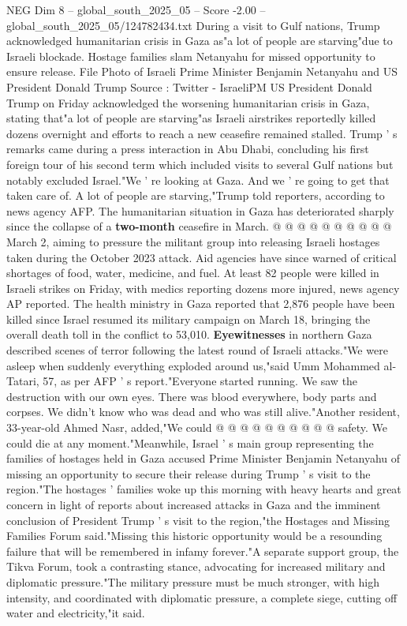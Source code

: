 \begin{textsample}{NEG Dim 8 – global\_south\_2025\_05 – Score -2.00 – global\_south\_2025\_05/124782434.txt}  \label{ex:f8_neg_009}
During a visit to Gulf nations, Trump acknowledged humanitarian crisis in Gaza as"a lot of people are starving"due to Israeli blockade.
Hostage families slam Netanyahu for missed opportunity to ensure release.
File Photo of Israeli Prime Minister Benjamin Netanyahu and US President Donald Trump Source : Twitter - IsraeliPM US President Donald Trump on Friday acknowledged the worsening humanitarian crisis in Gaza, stating that"a lot of people are starving"as Israeli airstrikes reportedly killed dozens overnight and efforts to reach a new ceasefire remained stalled.
Trump ' s remarks came during a press interaction in Abu Dhabi, concluding his first foreign tour of his second term which included visits to several Gulf nations but notably excluded Israel."We ' re looking at Gaza.
And we ' re going to get that taken care of.
A lot of people are starving,"Trump told reporters, according to news agency AFP.
The humanitarian situation in Gaza has deteriorated sharply since the collapse of a \textbf{two-month} ceasefire in March. @ @ @ @ @ @ @ @ @ @ March 2, aiming to pressure the militant group into releasing Israeli hostages taken during the October 2023 attack.
Aid agencies have since warned of critical shortages of food, water, medicine, and fuel.
At least 82 people were killed in Israeli strikes on Friday, with medics reporting dozens more injured, news agency AP reported.
The health ministry in Gaza reported that 2,876 people have been killed since Israel resumed its military campaign on March 18, bringing the overall death toll in the conflict to 53,010. \textbf{Eyewitnesses} in northern Gaza described scenes of terror following the latest round of Israeli attacks."We were asleep when suddenly everything exploded around us,"said Umm Mohammed al-Tatari, 57, as per AFP ' s report."Everyone started running.
We saw the destruction with our own eyes.
There was blood everywhere, body parts and corpses.
We didn't know who was dead and who was still alive."Another resident, 33-year-old Ahmed Nasr, added,"We could @ @ @ @ @ @ @ @ @ @ safety.
We could die at any moment."Meanwhile, Israel ' s main group representing the families of hostages held in Gaza accused Prime Minister Benjamin Netanyahu of missing an opportunity to secure their release during Trump ' s visit to the region."The hostages ' families woke up this morning with heavy hearts and great concern in light of reports about increased attacks in Gaza and the imminent conclusion of President Trump ' s visit to the region,"the Hostages and Missing Families Forum said."Missing this historic opportunity would be a resounding failure that will be remembered in infamy forever."A separate support group, the Tikva Forum, took a contrasting stance, advocating for increased military and diplomatic pressure."The military pressure must be much stronger, with high intensity, and coordinated with diplomatic pressure, a complete siege, cutting off water and electricity,"it said.

\end{textsample}
